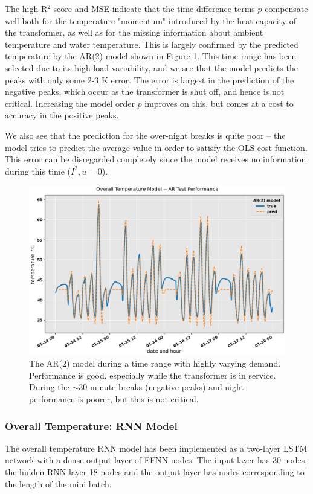 \documentclass[]{article}
\begin{document}
The high R$^2$ score and MSE indicate that the time-difference terms $p$ compensate well both for the temperature "momentum" introduced by the heat capacity of the transformer, as well as for the missing information about ambient temperature and water temperature. This is largely confirmed by the predicted temperature by the AR($2$) model shown in Figure \ref{fig:ar-model-performance}. This time range has been selected due to its high load variability, and we see that the model predicts the peaks with only some 2-3 K error. The error is largest in the prediction of the negative peaks, which occur as the transformer is shut off, and hence is not critical. Increasing the model order $p$ improves on this, but comes at a cost to accuracy in the positive peaks.

We also see that the prediction for the over-night breaks is quite poor -- the model tries to predict the average value in order to satisfy the OLS cost function. This error can be disregarded completely since the model receives no information during this time ($I^2, u = 0$).

\begin{figure}[!h]
	\centering
	\includegraphics[width=1\linewidth]{./figs/ar-model-performance.png}
	\caption{The AR($2$) model during a time range with highly varying demand. Performance is good, especially while the transformer is in service. During the $\sim 30$ minute breaks (negative peaks) and night performance is poorer, but this is not critical.}
	\label{fig:ar-model-performance}
\end{figure}

\subsubsection{Overall Temperature: RNN Model} \label{sec:results-overall-rnn}
The overall temperature RNN model has been implemented as a two-layer LSTM network with a dense output layer of FFNN nodes. The input layer has 30 nodes, the hidden RNN layer 18 nodes and the output layer has nodes corresponding to the length of the mini batch. 
\end{document}
